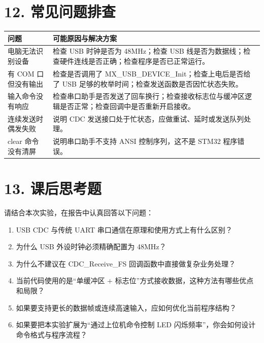 \documentclass[
  chinese,
  UTF8,
  oneside,
  openany]{ctexbook}
\providecommand{\tightlist}{%
  \setlength{\itemsep}{0pt}\setlength{\parskip}{0pt}}
\begin{document}
\section{12. 常见问题排查}\label{ux5e38ux89c1ux95eeux9898ux6392ux67e5}

\begin{longtable}[]{@{}
  >{\raggedright\arraybackslash}p{}
  >{\raggedright\arraybackslash}p{}@{}}
\toprule\noalign{}
\begin{minipage}[b]{\linewidth}\raggedright
问题
\end{minipage} & \begin{minipage}[b]{\linewidth}\raggedright
可能原因与解决方案
\end{minipage} \\
\midrule\noalign{}
\endhead
\bottomrule\noalign{}
\endlastfoot
电脑无法识别设备 & 检查 USB 时钟是否为 48MHz；检查 USB
线是否为数据线；检查硬件连线是否正确；检查程序是否已正常运行。 \\
有 COM 口但没有输出 & 检查是否调用了
MX\_USB\_DEVICE\_Init；检查上电后是否给了 USB
足够的枚举时间；检查发送函数是否因忙状态失败。 \\
输入命令没有响应 &
检查串口助手是否发送了回车换行；检查接收标志位与缓冲区逻辑是否正常；检查回调中是否重新开启接收。 \\
连续发送时偶发失败 & 说明 CDC
发送接口处于忙状态，应做重试、延时或发送队列处理。 \\
clear 命令没有清屏 & 说明串口助手不支持 ANSI 控制序列，这不是 STM32
程序错误。 \\
\end{longtable}

\section{13. 课后思考题}\label{ux8bfeux540eux601dux8003ux9898}

请结合本次实验，在报告中认真回答以下问题：

\begin{enumerate}
\def\labelenumi{\arabic{enumi}.}
\tightlist
\item
  USB CDC 与传统 UART 串口通信在原理和使用方式上有什么区别？
\item
  为什么 USB 外设时钟必须精确配置为 48MHz？
\item
  为什么不建议在 CDC\_Receive\_FS 回调函数中直接做复杂业务处理？
\item
  当前代码使用的是``单缓冲区 +
  标志位''方式接收数据，这种方法有哪些优点和局限？
\item
  如果要支持更长的数据帧或连续高速输入，应如何优化当前程序结构？
\item
  如果要把本实验扩展为``通过上位机命令控制 LED
  闪烁频率''，你会如何设计命令格式与程序流程？
\end{enumerate}
\end{document}
